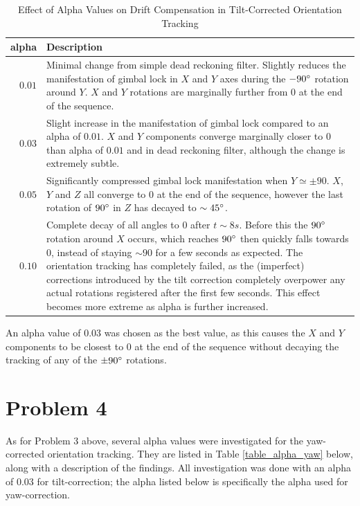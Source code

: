 \documentclass[11pt,a4paper]{article}
\begin{document}
	\begin{table}[h!]
		\caption{Effect of Alpha Values on Drift Compensation in Tilt-Corrected Orientation Tracking}
		\label{table_alpha_tilt}
		\begin{tabu} to 1.0\linewidth {|r|X[l]|}
			\hline
			alpha&Description\\
			\hline
			$0.01$&Minimal change from simple dead reckoning filter. Slightly reduces the manifestation of gimbal lock in $X$ and $Y$ axes during the $-90\degree$ rotation around $Y$. $X$ and $Y$ rotations are marginally further from $0$ at the end of the sequence.\\
			\hline
			$0.03$&Slight increase in the manifestation of gimbal lock compared to an alpha of $0.01$. $X$ and $Y$ components converge marginally closer to $0$ than alpha of $0.01$ and in dead reckoning filter, although the change is extremely subtle.\\
			\hline
			$0.05$&Significantly compressed gimbal lock manifestation when $Y \simeq \pm90$. $X$, $Y$ and $Z$ all converge to $0$ at the end of the sequence, however the last rotation of $90\degree$ in $Z$ has decayed to $\sim45\degree$.\\
			\hline
			$0.10$&Complete decay of all angles to $0$ after $t\sim8s$. Before this the $90\degree$ rotation around $X$ occurs, which reaches $90\degree$ then quickly falls towards $0$, instead of staying $\sim90$ for a few seconds as expected. The orientation tracking has completely failed, as the (imperfect) corrections introduced by the tilt correction completely overpower any actual rotations registered after the first few seconds. This effect becomes more extreme as alpha is further increased.\\
			\hline
		\end{tabu}
	\end{table}
	
	\noindent An alpha value of $0.03$ was chosen as the best value, as this causes the $X$ and $Y$ components to be closest to $0$ at the end of the sequence without decaying the tracking of any of the $\pm90\degree$ rotations.

	\section*{Problem 4}
	
	As for Problem 3 above, several alpha values were investigated for the yaw-corrected orientation tracking. They are listed in Table \ref{table_alpha_yaw} below, along with a description of the findings. All investigation was done with an alpha of $0.03$ for tilt-correction; the alpha listed below is specifically the alpha used for yaw-correction.
	
\end{document}
